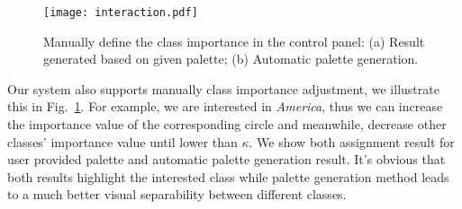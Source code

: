 \begin{figure}[h]
\centering
\texttt{[image: interaction.pdf]}
\caption{Manually define the class importance in the control panel: (a) Result generated based on given palette; (b) Automatic palette generation.}
\label{fig:casestudyinteraction}
\vspace{-4mm}
\end{figure}

Our system also supports manually class importance adjustment, we illustrate this in Fig.~\ref{fig:casestudyinteraction}. For example, we are interested in \emph{America}, thus we can increase the importance value of the corresponding circle and meanwhile, decrease other classes' importance value until lower than $\kappa$. We show both assignment result for user provided palette and automatic palette generation result. It's obvious that both results highlight the interested class while palette generation method leads to a much better visual separability between different classes.


